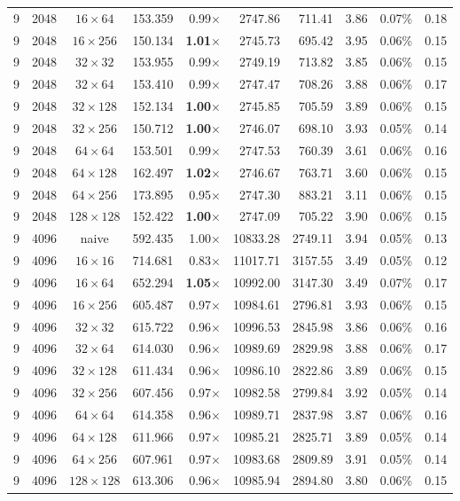 \documentclass[11pt,a4paper]{article}
\begin{document}
{\begin{longtable}{rrcrrrrrrr}
9 & 2048 & $16\times 64$ & 153.359 & 0.99$\times$ & 2747.86 & 711.41 & 3.86 & 0.07\% & 0.18 \\
9 & 2048 & $16\times 256$ & 150.134 & \textbf{1.01$\times$} & 2745.73 & 695.42 & 3.95 & 0.06\% & 0.15 \\
9 & 2048 & $32\times 32$ & 153.955 & 0.99$\times$ & 2749.19 & 713.82 & 3.85 & 0.06\% & 0.15 \\
9 & 2048 & $32\times 64$ & 153.410 & 0.99$\times$ & 2747.47 & 708.26 & 3.88 & 0.06\% & 0.17 \\
9 & 2048 & $32\times 128$ & 152.134 & \textbf{1.00$\times$} & 2745.85 & 705.59 & 3.89 & 0.06\% & 0.15 \\
9 & 2048 & $32\times 256$ & 150.712 & \textbf{1.00$\times$} & 2746.07 & 698.10 & 3.93 & 0.05\% & 0.14 \\
9 & 2048 & $64\times 64$ & 153.501 & 0.99$\times$ & 2747.53 & 760.39 & 3.61 & 0.06\% & 0.16 \\
9 & 2048 & $64\times 128$ & 162.497 & \textbf{1.02$\times$} & 2746.67 & 763.71 & 3.60 & 0.06\% & 0.15 \\
9 & 2048 & $64\times 256$ & 173.895 & 0.95$\times$ & 2747.30 & 883.21 & 3.11 & 0.06\% & 0.15 \\
9 & 2048 & $128\times 128$ & 152.422 & \textbf{1.00$\times$} & 2747.09 & 705.22 & 3.90 & 0.06\% & 0.15 \\
\midrule
9 & 4096 & naive & 592.435 & 1.00$\times$ & 10833.28 & 2749.11 & 3.94 & 0.05\% & 0.13 \\
9 & 4096 & $16\times 16$ & 714.681 & 0.83$\times$ & 11017.71 & 3157.55 & 3.49 & 0.05\% & 0.12 \\
9 & 4096 & $16\times 64$ & 652.294 & \textbf{1.05$\times$} & 10992.00 & 3147.30 & 3.49 & 0.07\% & 0.17 \\
9 & 4096 & $16\times 256$ & 605.487 & 0.97$\times$ & 10984.61 & 2796.81 & 3.93 & 0.06\% & 0.15 \\
9 & 4096 & $32\times 32$ & 615.722 & 0.96$\times$ & 10996.53 & 2845.98 & 3.86 & 0.06\% & 0.16 \\
9 & 4096 & $32\times 64$ & 614.030 & 0.96$\times$ & 10989.69 & 2829.98 & 3.88 & 0.06\% & 0.17 \\
9 & 4096 & $32\times 128$ & 611.434 & 0.96$\times$ & 10986.10 & 2822.86 & 3.89 & 0.06\% & 0.15 \\
9 & 4096 & $32\times 256$ & 607.456 & 0.97$\times$ & 10982.58 & 2799.84 & 3.92 & 0.05\% & 0.14 \\
9 & 4096 & $64\times 64$ & 614.358 & 0.96$\times$ & 10989.71 & 2837.98 & 3.87 & 0.06\% & 0.16 \\
9 & 4096 & $64\times 128$ & 611.966 & 0.97$\times$ & 10985.21 & 2825.71 & 3.89 & 0.05\% & 0.14 \\
9 & 4096 & $64\times 256$ & 607.961 & 0.97$\times$ & 10983.68 & 2809.89 & 3.91 & 0.05\% & 0.14 \\
9 & 4096 & $128\times 128$ & 613.306 & 0.96$\times$ & 10985.94 & 2894.80 & 3.80 & 0.06\% & 0.15 \\
\midrule
\end{longtable}
}
\end{document}
